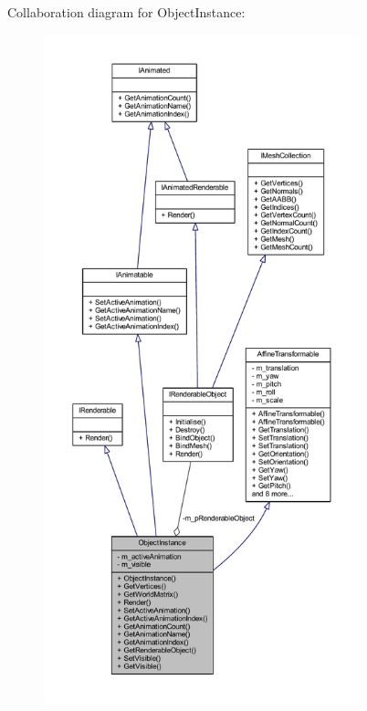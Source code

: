 Collaboration diagram for Object\+Instance\+:
\nopagebreak
\begin{figure}[H]
\begin{center}
\leavevmode
\includegraphics[height=550pt]{class_object_instance__coll__graph}
\end{center}
\end{figure}
